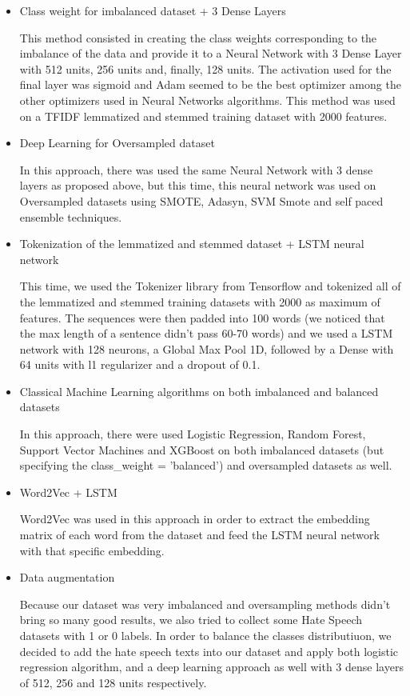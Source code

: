 \documentclass[11pt]{article}
\begin{document}
\begin{itemize}
\item Class weight for imbalanced dataset + 3 Dense Layers

This method consisted in creating the class weights corresponding to the
imbalance of the data and provide it to a Neural Network with 3 Dense Layer
with 512 units, 256 units and, finally, 128 units. The activation used for
the final layer was sigmoid and Adam seemed to be the best optimizer among
the other optimizers used in Neural Networks algorithms. This method was
used on a TFIDF lemmatized and stemmed training dataset with 2000 features.

\item Deep Learning for Oversampled dataset

In this approach, there was used the same Neural Network with 3 dense layers
as proposed above, but this time, this neural network was used on
Oversampled datasets using SMOTE, Adasyn, SVM Smote and self paced ensemble
techniques.

\item Tokenization of the lemmatized and stemmed dataset + LSTM neural
network

This time, we used the Tokenizer library from Tensorflow and tokenized all
of the lemmatized and stemmed training datasets with 2000 as maximum of
features. The sequences were then padded into 100 words (we noticed that the
max length of a sentence didn't pass 60-70 words) and we used a LSTM network
with 128 neurons, a Global Max Pool 1D, followed by a Dense with 64 units
with l1 regularizer and a dropout of 0.1.

\item Classical Machine Learning algorithms on both imbalanced and balanced
datasets

In this approach, there were used Logistic Regression, Random Forest,
Support Vector Machines and XGBoost on both imbalanced datasets (but
specifying the class\_weight = 'balanced') and oversampled datasets as well.

\item Word2Vec + LSTM

Word2Vec was used in this approach in order to extract the embedding matrix
of each word from the dataset and feed the LSTM neural network with that
specific embedding.

\item Data augmentation

Because our dataset was very imbalanced and oversampling methods didn't
bring so many good results, we also tried to collect some Hate Speech
datasets with 1 or 0 labels. In order to balance the classes distributiuon,
we decided to add the hate speech texts into our dataset and apply both
logistic regression algorithm, and a deep learning approach as well with 3
dense layers of 512, 256 and 128 units respectively.


\end{itemize}
\end{document}
